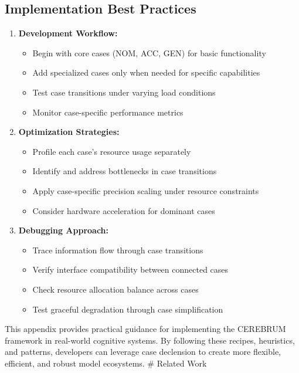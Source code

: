 \documentclass[
  11pt,
  letterpaper,
]{article}
\providecommand{\tightlist}{%
  \setlength{\itemsep}{0pt}\setlength{\parskip}{0pt}}
\begin{document}
\hypertarget{implementation-best-practices}{%
\subsection{Implementation Best
Practices}\label{implementation-best-practices}}

\begin{enumerate}
\def\labelenumi{\arabic{enumi}.}
\tightlist
\item
  \textbf{Development Workflow:}

  \begin{itemize}
  \tightlist
  \item
    Begin with core cases (NOM, ACC, GEN) for basic functionality
  \item
    Add specialized cases only when needed for specific capabilities
  \item
    Test case transitions under varying load conditions
  \item
    Monitor case-specific performance metrics
  \end{itemize}
\item
  \textbf{Optimization Strategies:}

  \begin{itemize}
  \tightlist
  \item
    Profile each case's resource usage separately
  \item
    Identify and address bottlenecks in case transitions
  \item
    Apply case-specific precision scaling under resource constraints
  \item
    Consider hardware acceleration for dominant cases
  \end{itemize}
\item
  \textbf{Debugging Approach:}

  \begin{itemize}
  \tightlist
  \item
    Trace information flow through case transitions
  \item
    Verify interface compatibility between connected cases
  \item
    Check resource allocation balance across cases
  \item
    Test graceful degradation through case simplification
  \end{itemize}
\end{enumerate}

This appendix provides practical guidance for implementing the CEREBRUM
framework in real-world cognitive systems. By following these recipes,
heuristics, and patterns, developers can leverage case declension to
create more flexible, efficient, and robust model ecosystems. \# Related
Work
\end{document}
